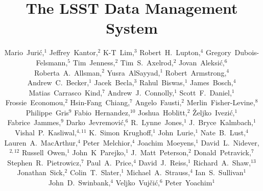 \documentclass[11pt,twoside]{article}
\begin{document}
\title{The LSST Data Management System}
\author{
Mario~Juri\'c,$^1$
Jeffrey~Kantor,$^2$
K-T~Lim,$^3$
Robert~H.~Lupton,$^4$
Gregory~Dubois-Felsmann,$^5$
Tim~Jenness,$^2$
Tim~S.~Axelrod,$^2$
Jovan~Aleksi\'c,$^6$
Roberta~A.~Allsman,$^2$
Yusra~AlSayyad,$^1$
Robert~Armstrong,$^4$
Andrew~C.~Becker,$^1$
Jacek~Becla,$^3$
Rahul~Biswas,$^1$
James~Bosch,$^4$
Matias~Carrasco~Kind,$^7$
Andrew~J.~Connolly,$^1$
Scott~F.~Daniel,$^1$
Frossie~Economou,$^2$
Hsin-Fang~Chiang,$^7$
Angelo~Fausti,$^2$
Merlin~Fisher-Levine,$^8$
Philippe~Gris$^9$
Fabio~Hernandez,$^{10}$
Joshua~Hoblitt,$^2$
\v{Z}eljko~Ivezi\'{c},$^1$
Fabrice~Jammes,$^9$
Darko~Jevremovi\'c,$^6$
R.~Lynne~Jones,$^1$
J.~Bryce~Kalmbach,$^1$
Vishal~P.~Kasliwal,$^{4,11}$
K.~Simon~Krughoff,$^1$
John~Lurie,$^1$
Nate~B.~Lust,$^4$
Lauren~A.~MacArthur,$^4$
Peter~Melchior,$^4$
Joachim~Moeyens,$^1$
David~L.~Nidever,$^{2,12}$
Russell~Owen,$^1$
John~K~Parejko,$^1$
J.~Matt~Peterson,$^2$
Donald~Petravick,$^7$
Stephen~R.~Pietrowicz,$^7$
Paul~A.~Price,$^4$
David~J.~Reiss,$^1$
Richard~A.~Shaw,$^{13}$
Jonathan~Sick,$^2$
Colin~T.~Slater,$^1$
Michael~A.~Strauss,$^4$
Ian~S.~Sullivan$^1$
John~D.~Swinbank,$^4$
Veljko~Vuj\v ci\'c,$^6$
Peter~Yoachim$^1$
%
}
\end{document}
